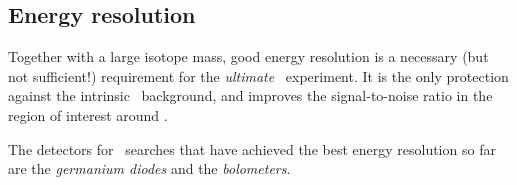 




\subsection{Energy resolution} \label{subsec:energyresolution}
%
Together with a large isotope mass, good energy resolution is a necessary (but not sufficient!) requirement for the \emph{ultimate} \bbonu\ experiment. It is the only protection against the intrinsic \bbtnu\ background, and improves the signal-to-noise ratio in the region of interest around \Qbb. 

The detectors for \bb\ searches that have achieved the best energy resolution so far are the \emph{germanium diodes} and the \emph{bolometers}. 

